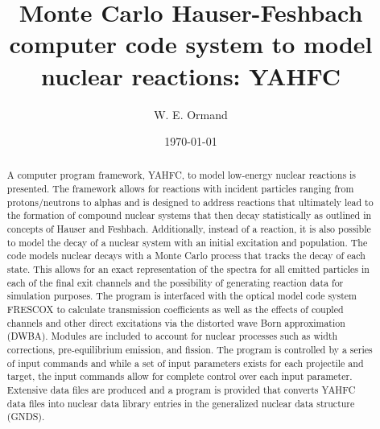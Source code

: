 \documentclass[
10pt,
showpacs,preprintnumbers,footinbib,
amsfonts,amsmath,amssymb,
aps,
prc,twocolumn,groupedaddress,superscriptaddress,
showkeys,
nofootinbib
]{revtex4-1}
\begin{document}
\title{Monte Carlo Hauser-Feshbach computer code system to model nuclear reactions: YAHFC  }

\author{W. E. Ormand}

\date{\today}


\begin{abstract}
A computer program framework, YAHFC, to model low-energy nuclear reactions is presented. The framework allows for reactions with incident particles ranging from protons/neutrons to alphas and is designed to address reactions that ultimately lead to the formation of compound nuclear systems that then decay statistically as outlined in concepts of Hauser and Feshbach.  Additionally, instead of a reaction, it is also possible to model the decay of a nuclear system with an initial excitation and population. The code models nuclear decays with a Monte Carlo process that tracks the decay of each state. This allows for an exact representation of the spectra for all emitted particles in each of the final exit channels and the possibility of generating reaction data for simulation purposes. The program is interfaced with the optical model code system FRESCOX to calculate transmission coefficients as well as the effects of coupled channels and other direct excitations via the distorted wave Born approximation (DWBA). Modules are included to account for nuclear processes such as width corrections, pre-equilibrium emission, and fission. The program is controlled by a series of input commands and while a set of input parameters exists for each projectile and target, the input commands allow for complete control over each input parameter. Extensive data files are produced and a program is provided that converts YAHFC data files into nuclear data library entries in the generalized nuclear data structure (GNDS). 
\end{abstract}

\maketitle
\end{document}
